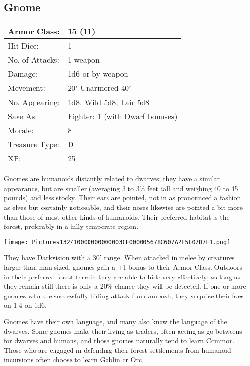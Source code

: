 \documentclass[a4paper,twoside,openany,10pt]{book}
\begin{document}
\begin{multicols}{2}
\subsection*{Gnome}\label{gnome}

\begin{tabularx}{0.48\textwidth}{@{}lX@{}}
Armor Class: & 15 (11) \\\hline
Hit Dice: & 1 \\\hline
No. of Attacks: & 1 weapon \\\hline
Damage: & 1d6 or by weapon \\\hline
Movement: & 20' Unarmored 40' \\\hline
No. Appearing: & 1d8, Wild 5d8, Lair 5d8 \\\hline
Save As: & Fighter: 1 (with Dwarf bonuses) \\\hline
Morale: & 8 \\\hline
Treasure Type: & D \\\hline
XP: & 25 \\\hline
\end{tabularx}\medskip

Gnomes are humanoids distantly related to dwarves; they have a similar appearance, but are smaller (averaging 3 to 3½ feet tall and weighing 40 to 45 pounds) and less stocky. Their ears are pointed, not in as pronounced a fashion as elves but certainly noticeable, and their noses likewise are pointed a bit more than those of most other kinds of humanoids. Their preferred habitat is the forest, preferably in a hilly temperate region.


\begin{center}
	\texttt{[image: Pictures132/10000000000003CF000005678C607A2F5E07D7F1.png]}
\end{center}

They have Darkvision with a 30' range. When attacked in melee by creatures larger than man-sized, gnomes gain a +1 bonus to their Armor Class. Outdoors in their preferred forest terrain they are able to hide very effectively; so long as they remain still there is only a 20\% chance they will be detected. If one or more gnomes who are successfully hiding attack from ambush, they surprise their foes on 1-4 on 1d6.

Gnomes have their own language, and many also know the language of the dwarves. Some gnomes make their living as traders, often acting as go-betweens for dwarves and humans, and those gnomes naturally tend to learn Common. Those who are engaged in defending their forest settlements from humanoid incursions often choose to learn Goblin or Orc.


\end{multicols}
\end{document}
